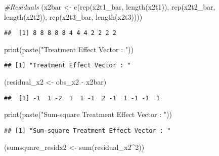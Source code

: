 \documentclass[
]{article}
\newenvironment{Shaded}{\begin{snugshade}}{\end{snugshade}}
\newcommand{\CommentTok}[1]{\textcolor[rgb]{0.56,0.35,0.01}{\textit{#1}}}
\newcommand{\DecValTok}[1]{\textcolor[rgb]{0.00,0.00,0.81}{#1}}
\newcommand{\FunctionTok}[1]{\textcolor[rgb]{0.00,0.00,0.00}{#1}}
\newcommand{\NormalTok}[1]{#1}
\newcommand{\OtherTok}[1]{\textcolor[rgb]{0.56,0.35,0.01}{#1}}
\newcommand{\SpecialCharTok}[1]{\textcolor[rgb]{0.00,0.00,0.00}{#1}}
\newcommand{\StringTok}[1]{\textcolor[rgb]{0.31,0.60,0.02}{#1}}
\begin{document}
\begin{Shaded}
\begin{Highlighting}[]
\CommentTok{\#Residuals}
\NormalTok{(x2bar }\OtherTok{\textless{}{-}} \FunctionTok{c}\NormalTok{(}\FunctionTok{rep}\NormalTok{(x2t1\_bar, }\FunctionTok{length}\NormalTok{(x2t1)), }
                \FunctionTok{rep}\NormalTok{(x2t2\_bar, }\FunctionTok{length}\NormalTok{(x2t2)), }
                \FunctionTok{rep}\NormalTok{(x2t3\_bar, }\FunctionTok{length}\NormalTok{(x2t3))))}
\end{Highlighting}
\end{Shaded}

\begin{verbatim}
##  [1] 8 8 8 8 8 4 4 4 2 2 2 2
\end{verbatim}

\begin{Shaded}
\begin{Highlighting}[]
\FunctionTok{print}\NormalTok{(}\FunctionTok{paste}\NormalTok{(}\StringTok{"Treatment Effect Vector : "}\NormalTok{))}
\end{Highlighting}
\end{Shaded}

\begin{verbatim}
## [1] "Treatment Effect Vector : "
\end{verbatim}

\begin{Shaded}
\begin{Highlighting}[]
\NormalTok{(residual\_x2 }\OtherTok{\textless{}{-}}\NormalTok{ obs\_x2 }\SpecialCharTok{{-}}\NormalTok{ x2bar)}
\end{Highlighting}
\end{Shaded}

\begin{verbatim}
##  [1] -1  1 -2  1  1 -1  2 -1  1 -1 -1  1
\end{verbatim}

\begin{Shaded}
\begin{Highlighting}[]
\FunctionTok{print}\NormalTok{(}\FunctionTok{paste}\NormalTok{(}\StringTok{"Sum{-}square Treatment Effect Vector : "}\NormalTok{))}
\end{Highlighting}
\end{Shaded}

\begin{verbatim}
## [1] "Sum-square Treatment Effect Vector : "
\end{verbatim}

\begin{Shaded}
\begin{Highlighting}[]
\NormalTok{(sumsquare\_residx2 }\OtherTok{\textless{}{-}} \FunctionTok{sum}\NormalTok{(residual\_x2}\SpecialCharTok{\^{}}\DecValTok{2}\NormalTok{))}
\end{Highlighting}
\end{Shaded}
\end{document}
